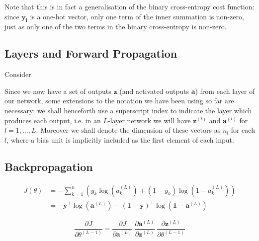 \documentclass{article}[11pt]
\begin{document}
        Note that this is in fact a generalisation of the binary cross-entropy cost function: since $\mathbf{y_i}$ is a one-hot vector, only one term of the inner summation is non-zero, just as only one of the two terms in the binary cross-entropy is non-zero.
        
        
        
    
    \subsection{Layers and Forward Propagation}
        
        Consider 
        
        
        
        
        
        
        
        
        
        Since we now have a set of outputs $\mathbf{z}$ (and activated outputs $\mathbf{a}$) from each layer of our network, some extensions to the notation we have been using so far are necessary: we shall henceforth use a superscript index to indicate the layer which produces each output, i.e. in an $L$-layer network we will have $\mathbf{z}^{(l)}$ and $\mathbf{a}^{(l)}$ for $l = 1, \ldots, L$. Moreover we shall denote the dimension of these vectors as $n_l$ for each $l$, where a bias unit is implicitly included as the first element of each input. %
        
        

    \subsection{Backpropagation}
        
        
        $$ \begin{aligned}
        J(\theta)
        &= - \sum_{k=1}^{n} \left( y_k \log(a^{(L)}_k) + (1 - y_k) \log(1 - a^{(L)}_k) \right) \\
        &= -\mathbf{y}^\top \log(\mathbf{a}^{(L)}) - (\mathbf{1}-\mathbf{y})^\top \log(\mathbf{1} - \mathbf{a}^{(L)})
        \end{aligned} $$
        
        
        
        $$
        \frac{\partial J}{\partial \theta^{(L-1)}} =
            \frac{\partial J}{\partial \mathbf{a}^{(L)}} \
            \frac{\partial \mathbf{a}^{(L)}}{\partial \mathbf{z}^{(L)}} \
            \frac{\partial \mathbf{z}^{(L)}}{\partial \theta^{(L-1)}}
        $$
\end{document}
